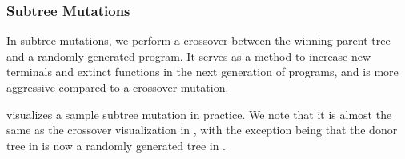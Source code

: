\subsubsection{Subtree Mutations}
\label{subsec:subtree}
In subtree mutations, we perform a crossover between the winning parent tree and a randomly generated program. It serves as a method to increase new terminals and extinct functions in the next generation of programs, and is more aggressive compared to a crossover mutation\citep{gplearn}.

 visualizes a sample subtree mutation in practice. We note that it is almost the same as the crossover visualization in , with  the exception being that the donor tree in  is now a randomly generated tree in . 

